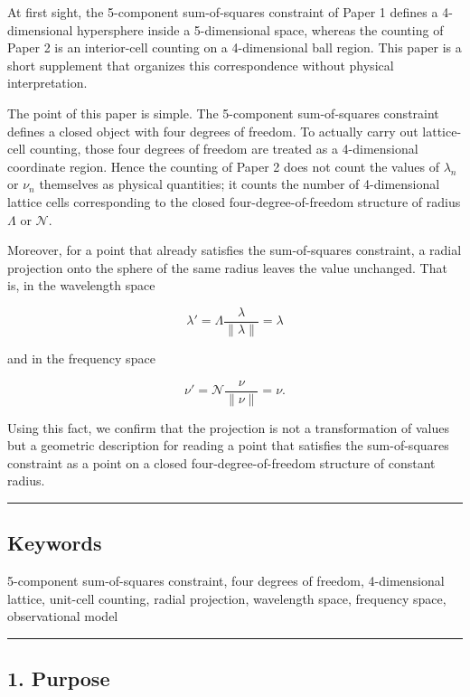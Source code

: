 \documentclass[
]{article}
\begin{document}
At first sight, the 5-component sum-of-squares constraint of Paper 1
defines a 4-dimensional hypersphere inside a 5-dimensional space,
whereas the counting of Paper 2 is an interior-cell counting on a
4-dimensional ball region. This paper is a short supplement that
organizes this correspondence without physical interpretation.

The point of this paper is simple. The 5-component sum-of-squares
constraint defines a closed object with four degrees of freedom. To
actually carry out lattice-cell counting, those four degrees of freedom
are treated as a 4-dimensional coordinate region. Hence the counting of
Paper 2 does not count the values of \(\lambda_n\) or \(\nu_n\)
themselves as physical quantities; it counts the number of 4-dimensional
lattice cells corresponding to the closed four-degree-of-freedom
structure of radius \(\Lambda\) or \(\mathcal{N}\).

Moreover, for a point that already satisfies the sum-of-squares
constraint, a radial projection onto the sphere of the same radius
leaves the value unchanged. That is, in the wavelength space

\[
\lambda'=\Lambda\frac{\lambda}{\|\lambda\|}=\lambda
\]

and in the frequency space

\[
\nu'=\mathcal{N}\frac{\nu}{\|\nu\|}=\nu .
\]

Using this fact, we confirm that the projection is not a transformation
of values but a geometric description for reading a point that satisfies
the sum-of-squares constraint as a point on a closed
four-degree-of-freedom structure of constant radius.

\begin{center}\rule{0.5\linewidth}{0.5pt}\end{center}

\subsection{Keywords}\label{keywords}

5-component sum-of-squares constraint, four degrees of freedom,
4-dimensional lattice, unit-cell counting, radial projection, wavelength
space, frequency space, observational model

\begin{center}\rule{0.5\linewidth}{0.5pt}\end{center}

\subsection{1. Purpose}\label{purpose}
\end{document}
